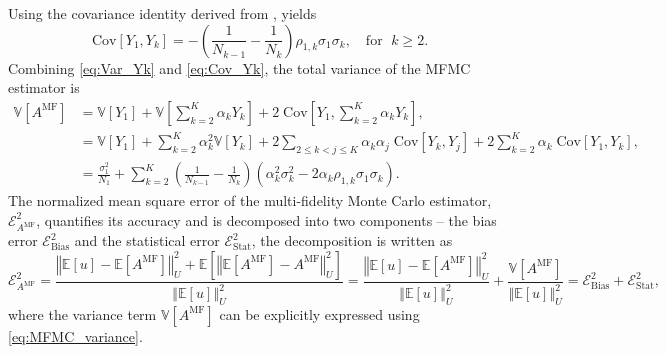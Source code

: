  Using the covariance identity derived from \cite[Lemma~3.2]{PeWiGu:2016}, yields
%
\begin{equation}\label{eq:Cov_Yk}
\text{Cov}[Y_1,Y_k] = - \left(\frac{1}{N_{k-1}} - \frac{1}{N_k}\right)\rho_{1,k}\sigma_1\sigma_k, \quad \text{for } \; k\ge 2.
\end{equation}
%
Combining \eqref{eq:Var_Yk} and \eqref{eq:Cov_Yk}, the total variance of the MFMC estimator is 
%
\begin{align}
    \nonumber
    \mathbb{V}\left[A^{\text{MF}}\right] &= \mathbb{V}\left[Y_1\right] + \mathbb{V}\left[\sum_{k=2}^K \alpha_kY_k\right]+2\;\text{Cov}\left[Y_1,\sum_{k=2}^K \alpha_k Y_k \right],\\
    \nonumber
    &=\mathbb{V}\left[Y_1\right] + \sum_{k=2}^K \alpha_k^2 \mathbb{V}\left[Y_k\right]+2\sum_{2\le k<j\le K} \alpha_k\alpha_j\; \text{Cov}[Y_k,Y_j] +2\sum_{k=2}^K \alpha_k\;\text{Cov}\left[Y_1, Y_k\right],\\
    \label{eq:MFMC_variance}
    &=\frac{\sigma_1^2}{N_1} + \sum_{k=2}^K \left(\frac{1}{N_{k-1}} - \frac{1}{N_k}\right)\left(\alpha_k^2\sigma_k^2 - 2\alpha_k\rho_{1,k}\sigma_1\sigma_k\right).
\end{align}
%
The normalized mean square error of the multi-fidelity Monte Carlo estimator, $\mathcal{E}_{A^{\text{MF}}}^2$, quantifies its accuracy and is decomposed into two components -- the bias error $\mathcal{E}_{\text{Bias}}^2$ and the statistical error $\mathcal{E}_{\text{Stat}}^2$, the decomposition is written as 
%
\[
\mathcal{E}_{A^{\text{MF}}}^2= \frac{\left\Vert\mathbb{E}[u]-\mathbb{E}\left[A^{\text{MF}}\right] \right\Vert_{U}^2+\mathbb E\left[\left\Vert\mathbb{E}\left[A^{\text{MF}}\right]-A^{\text{MF}} \right\Vert_{U}^2\right]}{\left\Vert\mathbb{E}[u] \right\Vert_{U}^2} =\frac{\left\Vert\mathbb{E}[u]-\mathbb{E}\left[A^{\text{MF}}\right] \right\Vert_{U}^2}{\left\Vert\mathbb{E}[u] \right\Vert_{U}^2}+ \frac{\mathbb{V}\left[A^{\text{MF}}\right]}{\left\Vert\mathbb{E}[u] \right\Vert_{U}^2}=\mathcal{E}_{\text{Bias}}^2 + \mathcal{E}_{\text{Stat}}^2,
\]
%
where the variance term $\mathbb{V}[A^{\text{MF}}]$  can be explicitly expressed using \eqref{eq:MFMC_variance}. 

